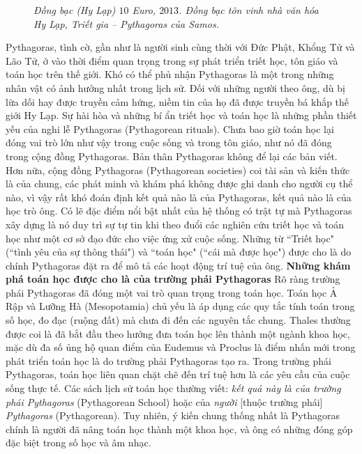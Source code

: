 \begin{multicols}{2}
\begin{figure}[H]
		\caption{\small\textit{\color{lichsutoanhoc}Đồng bạc (Hy Lạp) $10$ Euro, $2013$. Đồng bạc tôn vinh nhà văn hóa Hy Lạp, Triết gia -- Pythagoras của Samos.}}
		\vspace*{-10pt}
	\end{figure}
	Pythagoras, tình cờ, gần như là người sinh cùng thời với Đức Phật, Khổng Tử và Lão Tử, ở vào thời điểm quan trọng trong sự phát triển triết học, tôn giáo và toán học trên thế giới.
	\vskip 0.1cm
	Khó có thể phủ nhận Pythagoras là một trong những nhân vật có ảnh hưởng nhất trong lịch sử. Đối với những người theo ông, dù bị lừa dối hay được truyền cảm hứng, niềm tin của họ đã được truyền bá khắp thế giới Hy Lạp. Sự hài hòa và những bí ẩn triết học và toán học là những phần thiết yếu của nghi lễ Pythagoras (Pythagorean rituals). Chưa bao giờ toán học lại đóng vai trò lớn như vậy trong cuộc sống và trong tôn giáo, như nó đã đóng trong cộng đồng Pythagoras. 
	\vskip 0.1cm
	Bản thân Pythagoras không để lại các bản viết. Hơn nữa, cộng đồng Pythagoras (Pythagorean societies) coi tài sản và kiến thức là của chung, các phát minh và khám phá không được ghi danh cho người cụ thể nào, vì vậy rất khó đoán định kết quả nào là của Pythagoras, kết quả nào là của học trò ông.  Có lẽ đặc điểm nổi bật nhất của hệ thống có trật tự mà Pythagoras xây dựng là nó duy trì sự tự tin khi theo đuổi các nghiên cứu triết học và toán học như một cơ sở đạo đức cho việc ứng xử cuộc sống.  Những từ ``Triết học" (``tình yêu của sự thông thái") và ``toán học" (``cái mà được học") được cho là do chính Pythagoras đặt ra để mô tả các hoạt động trí tuệ của ông.
	\vskip 0.1cm
	\textbf{\color{lichsutoanhoc}Những khám phá toán học được cho là của trường phái Pythagoras}
	\vskip 0.1cm
	Rõ ràng trường phái Pythagoras đã đóng một vai trò quan trọng trong toán học. Toán học Ả Rập và Lưỡng Hà (Mesopotamia) chủ yếu là áp dụng các quy tắc tính toán trong số học, đo đạc (ruộng đất) mà chưa đi đến các nguyên tắc chung.
	\vskip 0.1cm  
	Thales thường được coi là đã bắt đầu theo hướng đưa toán học lên thành một ngành khoa học, mặc dù đa số ủng hộ quan điểm của Eudemus và Proclus là điểm nhấn mới trong phát triển toán học là do trường phải Pythagoras tạo ra.
	\vskip 0.1cm
	Trong trường phái Pythagoras, toán học liên quan chặt chẽ đến trí tuệ hơn là các yêu cầu của cuộc sống thực tế.
	\vskip 0.1cm
	Các sách lịch sử toán học thường viết: \textit{kết quả này là của trường phái Pythagoras} (Pythagorean School)  hoặc của \textit{người} [thuộc trường phái] \textit{Pythagoras} (Pythagorean). Tuy nhiên, ý kiến chung thống nhất là Pythagoras chính là người đã nâng toán học thành một khoa học, và ông có những đóng góp đặc biệt trong số học và âm nhạc.

\end{multicols}
